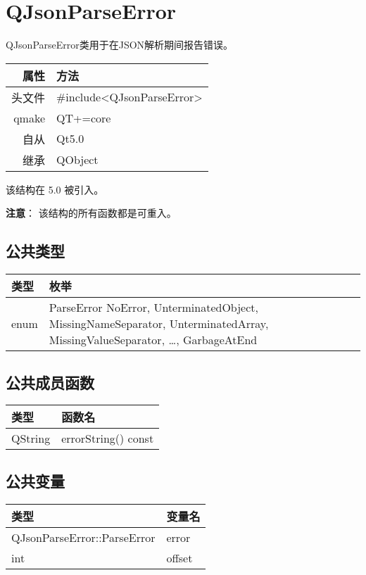 \chapter{QJsonParseError}

QJsonParseError类用于在JSON解析期间报告错误。

\begin{tabular}{|r|l|}
	\hline
	属性 & 方法 \\
	\hline
	头文件 & \#include<QJsonParseError>\\      
	\hline
	qmake & QT+=core\\      
	\hline
	自从 & Qt5.0\\
	\hline
	继承&QObject \\
	\hline
\end{tabular}

该结构在 5.0 被引入。

\textbf{注意}： 该结构的所有函数都是可重入。


\section{公共类型}

\begin{tabular}{|l|l|}
	\hline
	类型& 	枚举\\
\hline
enum &	ParseError { NoError, UnterminatedObject, MissingNameSeparator, UnterminatedArray, MissingValueSeparator, …, GarbageAtEnd }\\
	\hline
\end{tabular}


\section{公共成员函数}


\begin{tabular}{|l|l|}
	\hline
类型 &	函数名\\
\hline
QString &	errorString() const\\
	\hline
\end{tabular}


\section{公共变量}

\begin{tabular}{|l|l|}
\hline
类型 	&变量名\\
\hline
QJsonParseError::ParseError& 	error\\
\hline
int 	&offset\\
\hline
\end{tabular}


